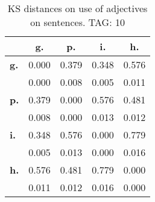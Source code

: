 \begin{table}[h!]
\begin{center}
\begin{tabular}{| l || c | c | c | c |}\hline
 & {\bf g.} & {\bf p.} & {\bf i.} & {\bf h.} \\\hline\hline
{\bf g.} & 0.000 & 0.379 & 0.348 & 0.576 \\
{\bf } & 0.000 & 0.008 & 0.005 & 0.011 \\\hline
{\bf p.} & 0.379 & 0.000 & 0.576 & 0.481 \\
{\bf } & 0.008 & 0.000 & 0.013 & 0.012 \\\hline
{\bf i.} & 0.348 & 0.576 & 0.000 & 0.779 \\
{\bf } & 0.005 & 0.013 & 0.000 & 0.016 \\\hline
{\bf h.} & 0.576 & 0.481 & 0.779 & 0.000 \\
{\bf } & 0.011 & 0.012 & 0.016 & 0.000 \\\hline
\end{tabular}
\caption{KS distances on use of adjectives on sentences. TAG: 10}
\end{center}
\end{table}